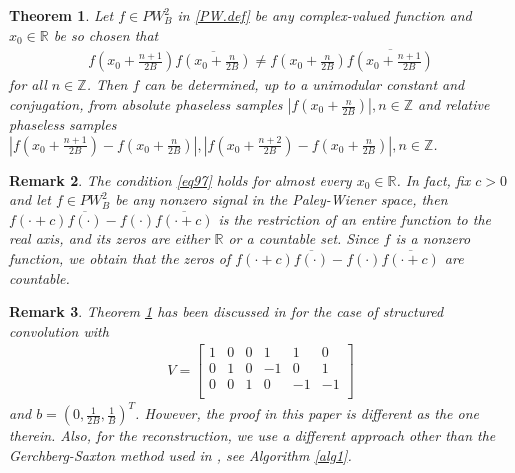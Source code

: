 \documentclass[12pt,oneside,reqno]{amsart}
\newtheorem{theorem}{Theorem}[section]
\newtheorem{remark}[theorem]{Remark}%
\newcommand{\Z}{\mathbb{Z}}
\newcommand{\R}{\mathbb{R}}
\numberwithin{equation}{section}
\begin{document}
\begin{theorem}\label{PW.adj.thm2}
Let  $f\in PW_B^2$ in  \eqref{PW.def} be any complex-valued function and $x_0\in \R$ be so chosen that  
\begin{align}\label{eq97}
	f(x_0+\frac{n+1}{2B})\overline{f(x_0+\frac{n}{2B})} \ne f(x_0+\frac{n}{2B}) \overline{f(x_0+\frac{n+1}{2B})}
\end{align}
for all $n\in \Z$. Then $f$ can be determined, up to a unimodular constant and conjugation, from absolute phaseless samples $ |f(x_0+\frac{n}{2B})|, n\in \Z $ and relative phaseless samples $  |f(x_0+\frac{n+1}{2B})-f(x_0+\frac{n}{2B})|, |f(x_0+\frac{n+2}{2B})-f(x_0+\frac{n}{2B})|, n\in \Z$.   
\end{theorem}


\begin{remark}\label{rem1}
 The condition \eqref{eq97} holds for almost every $x_0\in \R$. 
In fact, fix $c>0$ and let $f\in PW_B^2$ be any nonzero signal in the Paley-Wiener space, then $f(\cdot+c)\overline{f(\cdot)} - f(\cdot) \overline{f(\cdot+c)}$ is the restriction of an entire function to the real axis, and its zeros are either $\R$ or a countable set.  Since $f$ is a nonzero function, we obtain that the zeros of $f(\cdot+c)\overline{f(\cdot)} - f(\cdot) \overline{f(\cdot+c)}$ are countable.
\end{remark}






\begin{remark}
Theorem \ref{PW.adj.thm2} has been discussed in \cite{lai2021conjugate} for  the case of structured convolution with
\begin{align*}
	V= \begin{bmatrix}
		1 & 0 & 0 & 1 & 1 & 0 \\
		0 & 1 & 0 & -1 & 0 & 1 \\
		0 & 0 & 1 & 0 & -1 & -1 \\
	\end{bmatrix}
\end{align*}
and $b=(0,\frac{1}{2B},\frac{1}{B})^T$. However, the proof in this paper is different as the one therein. Also, for the reconstruction, we use a different approach other than the Gerchberg-Saxton method used in \cite{lai2021conjugate}, see Algorithm \ref{alg1}.
\end{remark}
\end{document}
